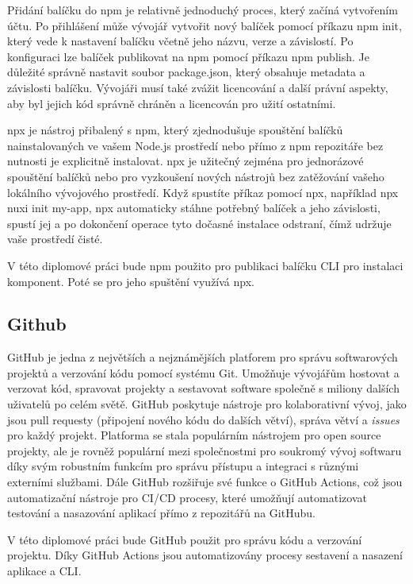Přidání balíčku do npm je relativně jednoduchý proces, který začíná vytvořením účtu. Po přihlášení může vývojář vytvořit nový balíček pomocí příkazu npm init, který vede k nastavení balíčku včetně jeho názvu, verze a závislostí. Po konfiguraci lze balíček publikovat na npm pomocí příkazu npm publish. Je důležité správně nastavit soubor package.json, který obsahuje metadata a závislosti balíčku. Vývojáři musí také zvážit licencování a další právní aspekty, aby byl jejich kód správně chráněn a licencován pro užití ostatními.

npx je nástroj přibalený s npm, který zjednodušuje spouštění balíčků nainstalovaných ve vašem Node.js prostředí nebo přímo z npm repozitáře bez nutnosti je explicitně instalovat. npx je užitečný zejména pro jednorázové spouštění balíčků nebo pro vyzkoušení nových nástrojů bez zatěžování vašeho lokálního vývojového prostředí. Když spustíte příkaz pomocí npx, například npx nuxi init my-app, npx automaticky stáhne potřebný balíček a jeho závislosti, spustí jej a po dokončení operace tyto dočasné instalace odstraní, čímž udržuje vaše prostředí čisté.

V této diplomové práci bude npm použito pro publikaci balíčku CLI pro instalaci komponent. Poté se pro jeho spuštění využívá npx.

\subsection{Github}
GitHub je jedna z největších a nejznámějších platforem pro správu softwarových projektů a verzování kódu pomocí systému Git. Umožňuje vývojářům hostovat a verzovat kód, spravovat projekty a sestavovat software společně s miliony dalších uživatelů po celém světě. GitHub poskytuje nástroje pro kolaborativní vývoj, jako jsou pull requesty (připojení nového kódu do dalších větví), správa větví a \emph{issues} pro každý projekt. Platforma se stala populárním nástrojem pro open source projekty, ale je rovněž populární mezi společnostmi pro soukromý vývoj softwaru díky svým robustním funkcím pro správu přístupu a integraci s různými externími službami. Dále GitHub rozšiřuje své funkce o GitHub Actions, což jsou automatizační nástroje pro CI/CD procesy, které umožňují automatizovat testování a nasazování aplikací přímo z repozitářů na GitHubu. \cite{Github}

V této diplomové práci bude GitHub použit pro správu kódu a verzování projektu. Díky GitHub Actions jsou automatizovány procesy sestavení a nasazení aplikace a CLI.

